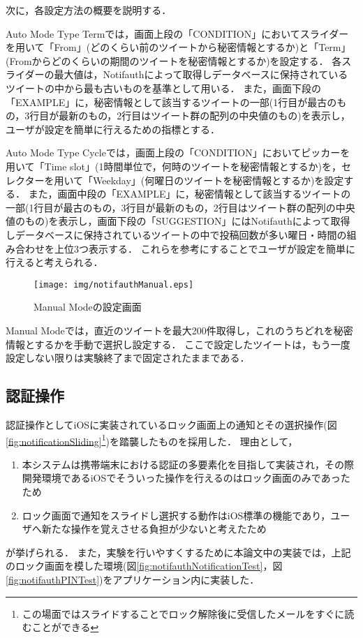 次に，各設定方法の概要を説明する．

Auto Mode Type Termでは，画面上段の「CONDITION」においてスライダーを用いて「From」(どのくらい前のツイートから秘密情報とするか)と「Term」(Fromからどのくらいの期間のツイートを秘密情報とするか)を設定する．
各スライダーの最大値は，Notifauthによって取得しデータベースに保持されているツイートの中から最も古いものを基準として用いる．
また，画面下段の「EXAMPLE」に，秘密情報として該当するツイートの一部(1行目が最古のもの，3行目が最新のもの，2行目はツイート群の配列の中央値のもの)を表示し，ユーザが設定を簡単に行えるための指標とする．

Auto Mode Type Cycleでは，画面上段の「CONDITION」においてピッカーを用いて「Time slot」(1時間単位で，何時のツイートを秘密情報とするか)を，セレクターを用いて「Weekday」(何曜日のツイートを秘密情報とするか)を設定する．
また，画面中段の「EXAMPLE」に，秘密情報として該当するツイートの一部(1行目が最古のもの，3行目が最新のもの，2行目はツイート群の配列の中央値のもの)を表示し，画面下段の「SUGGESTION」にはNotifauthによって取得しデータベースに保持されているツイートの中で投稿回数が多い曜日・時間の組み合わせを上位3つ表示する．
これらを参考にすることでユーザが設定を簡単に行えると考えられる．

\begin{figure}
  \begin{center}
    \texttt{[image: img/notifauthManual.eps]}
  \end{center}
  \caption{Manual Modeの設定画面}
  \label{fig:notifauthManual}
\end{figure}

Manual Modeでは，直近のツイートを最大200件取得し，これのうちどれを秘密情報とするかを手動で選択し設定する．
ここで設定したツイートは，もう一度設定しない限りは実験終了まで固定されたままである．

\subsection{認証操作}
認証操作としてiOSに実装されているロック画面上の通知とその選択操作(図\ref{fig:notificationSliding}\footnote{この場面ではスライドすることでロック解除後に受信したメールをすぐに読むことができる})を踏襲したものを採用した．
理由として，
\begin{enumerate}
  \item 本システムは携帯端末における認証の多要素化を目指して実装され，その際開発環境であるiOSでそういった操作を行えるのはロック画面のみであったため
  \item ロック画面で通知をスライドし選択する動作はiOS標準の機能であり，ユーザへ新たな操作を覚えさせる負担が少ないと考えたため
\end{enumerate}
が挙げられる．
また，実験を行いやすくするために本論文中の実装では，上記のロック画面を模した環境(図\ref{fig:notifauthNotificationTest}，図\ref{fig:notifauthPINTest})をアプリケーション内に実装した．

